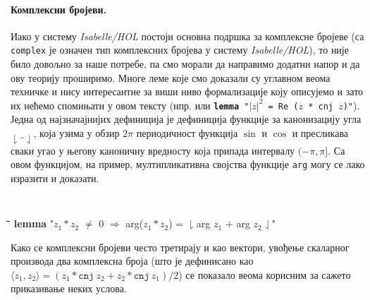 \paragraph{Комплексни бројеви.}
Иако у систему \emph{Isabelle/HOL} постоји основна подршка за
комплексне бројеве (са {\tt complex} је означен тип комплексних
бројева у систему \emph{Isabelle/HOL}), то није било довољно за наше
потребе, па смо морали да направимо додатни напор и да ову теорију
проширимо. Многе леме које смо доказали су углавном веома техничке и
нису интересантне за виши ниво формализације коју описујемо и зато их
нећемо спомињати у овом тексту (нпр.  или {\tt \textbf{lemma} "$|z|^2$
  = Re ($z$ * cnj $z$)"}). Једна од
најзначајнијих дефиниција је дефиниција функције за канонизацију угла
$\downharpoonright \_ \downharpoonleft$, која узима у обзир $2\pi$
периодичност функција $\sin$ и $\cos$ и пресликава сваки угао у његову
каноничну вредносту која припада интервалу $(-\pi, \pi]$. Са овом
  функцијом, на пример, мултипликативна својства функције {\tt arg}
  могу се лако изразити и доказати.   {\tt
  \begin{tabbing}
    \hspace{5mm}\=\hspace{5mm}\=\hspace{5mm}\=\hspace{5mm}\=\hspace{5mm}\=\kill
    \textbf{lemma} "$z_1 * z_2$ $\neq$ 0 $\Longrightarrow$ arg($z_1 * z_2$) = $\downharpoonright$arg $z_1$ $+$ arg $z_2$$\downharpoonleft$"
  \end{tabbing}
}

\noindent Како се комплексни бројеви често третирају и као вектори,
увођење скаларног производа два комплексна броја (што је дефинисано
као $\langle z_1, z_2\rangle = (z_1*\mathtt{cnj}\ z_2 +
z_2*\mathtt{cnj}\ z_1) / 2$) се показало веома корисним за сажето
приказивање неких услова.

